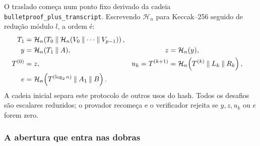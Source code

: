 %
O traslado começa num ponto fixo derivado da cadeia
\texttt{bulletproof\_plus\_transcript}. Escrevendo
\(\mathcal H_n\) para Keccak--256 seguido de redução módulo \(l\), a ordem é:
\begin{align}
 T_1&=\mathcal H_n\!\left(
   T_0\mathbin\|\mathcal H_n(V_0\mathbin\|\cdots\mathbin\|V_{p-1})
   \right),\notag\\
 y&=\mathcal H_n(T_1\mathbin\|A),&
 z&=\mathcal H_n(y),\label{eq:bpp-transcript-start}\\
 T^{(0)}&=z,&
 u_k=T^{(k+1)}&=\mathcal H_n\!\left(
   T^{(k)}\mathbin\|L_k\mathbin\|R_k\right),
   \label{eq:bpp-transcript-round}\\
 e&=\mathcal H_n\!\left(
   T^{(\log_2 n)}\mathbin\|A_1\mathbin\|B\right).
 \label{eq:bpp-transcript-end}
\end{align}
A cadeia inicial separa este protocolo de outros usos do hash. Todos os
desafios são escalares reduzidos; o provador recomeça e o verificador rejeita
se \(y,z,u_k\) ou \(e\) forem zero.


\subsubsection{A abertura que entra nas dobras}
\label{sec:bpp_detalhes}

